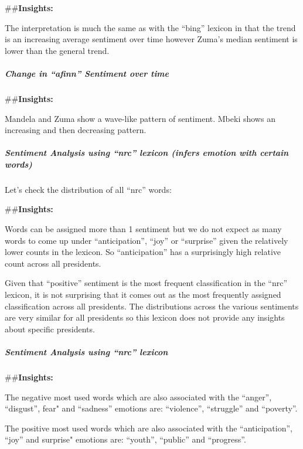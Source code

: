 \documentclass[]{article}
\let\oldsubparagraph\subparagraph
\renewcommand{\subparagraph}[1]{\oldsubparagraph{#1}\mbox{}}
\begin{document}
\#\#\textbf{Insights:}

The interpretation is much the same as with the ``bing'' lexicon in that
the trend is an increasing average sentiment over time however Zuma's
median sentiment is lower than the general trend.

\hypertarget{change-in-afinn-sentiment-over-time}{%
\subparagraph{\texorpdfstring{\textbf{Change in ``afinn'' Sentiment over
time}}{Change in ``afinn'' Sentiment over time}}\label{change-in-afinn-sentiment-over-time}}

\#\#\textbf{Insights:}

Mandela and Zuma show a wave-like pattern of sentiment. Mbeki shows an
increasing and then decreasing pattern.

\hypertarget{sentiment-analysis-using-nrc-lexicon-infers-emotion-with-certain-words}{%
\subparagraph{\texorpdfstring{\textbf{Sentiment Analysis using ``nrc''
lexicon (infers emotion with certain
words)}}{Sentiment Analysis using ``nrc'' lexicon (infers emotion with certain words)}}\label{sentiment-analysis-using-nrc-lexicon-infers-emotion-with-certain-words}}

Let's check the distribution of all ``nrc'' words:

\#\#\textbf{Insights:}

Words can be assigned more than 1 sentiment but we do not expect as many
words to come up under ``anticipation'', ``joy'' or ``surprise'' given
the relatively lower counts in the lexicon. So ``anticipation'' has a
surprisingly high relative count across all presidents.

Given that ``positive'' sentiment is the most frequent classification in
the ``nrc'' lexicon, it is not surprising that it comes out as the most
frequently assigned classification across all presidents. The
distributions across the various sentiments are very similar for all
presidents so this lexicon does not provide any insights about specific
presidents.

\hypertarget{sentiment-analysis-using-nrc-lexicon}{%
\subparagraph{\texorpdfstring{\textbf{Sentiment Analysis using ``nrc''
lexicon}}{Sentiment Analysis using ``nrc'' lexicon}}\label{sentiment-analysis-using-nrc-lexicon}}

\#\#\textbf{Insights:}

The negative most used words which are also associated with the
``anger'', ``disgust'', fear" and ``sadness'' emotions are:
``violence'', ``struggle'' and ``poverty''.

The positive most used words which are also associated with the
``anticipation'', ``joy'' and surprise" emotions are: ``youth'',
``public'' and ``progress''.
\end{document}
